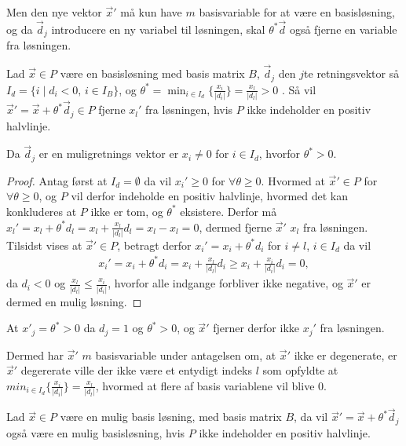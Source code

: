Men den nye vektor $\vec{x}'$ må kun have $m$ basisvariable for at være en basisløsning, og da $\vec{d}_j$ introducere en ny variabel til løsningen, skal $\theta^*\vec{d}$ også fjerne en variable fra  løsningen.
\begin{lma}
Lad $\vec{x} \in P$ være en basisløsning med basis matrix $B$, $\vec{d}_j$ den $j$te retningsvektor så $I_d = \{i \mid d_i < 0, \, i  \in I_B\}$, og $\theta^* = \min_{i \in I_d}\{\frac{x_i}{|d_i|}\}=\frac{x_l}{|d_l|} > 0$ . 
Så vil $\vec{x}' = \vec{x}+ \theta^* \vec{d}_j \in P$ fjerne $x_l'$ fra løsningen, hvis $P$ ikke indeholder en positiv halvlinje.
\label{lma:skalar}
\end{lma}
\begin{bem}
Da $\vec{d}_j$ er en muligretnings vektor er $x_i\neq 0$ for $i \in I_d$, hvorfor $\theta^* > 0$.
\end{bem}
\begin{proof}
Antag først at $I_d = \emptyset$ da vil $x_i' \geq 0$ for $\forall \theta \geq 0$. 
Hvormed at $\vec{x}' \in P$ for $\forall \theta \geq 0$, og $P$ vil derfor indeholde en positiv halvlinje, hvormed det kan konkluderes at $P$ ikke er tom, og $\theta^*$ eksistere.
Derfor må $x_l' = x_l + \theta^* d_l = x_l + \frac{x_l}{|d_l|}d_l = x_l - x_l = 0$, dermed fjerne $\vec{x}'$ $x_l$ fra løsningen.
Tilsidst vises at $\vec{x}' \in P$, betragt derfor $x_i' = x_i + \theta^* d_i$ for $i \neq l$, $i \in I_d$ da vil
\begin{align*}
x_i' = x_i + \theta^* d_i = x_i + \frac{x_l}{|d_l|}d_i \geq x_i + \frac{x_i}{|d_i|}d_i = 0,
\end{align*}
da $d_i < 0$ og $\frac{x_l}{|d_l|} \leq \frac{x_i}{|d_i|}$, hvorfor alle indgange forbliver ikke negative, og $\vec{x}'$ er dermed en mulig løsning.
\end{proof}
\begin{bem}
At $x'_j = \theta^* >  0$ da $d_j = 1$ og $\theta^* > 0$, og $\vec{x}'$ fjerner derfor ikke $x_j'$ fra løsningen.
\end{bem}
Dermed har $\vec{x}'$ $m$ basisvariable under antagelsen om, at $\vec{x}'$ ikke er degenerate, er $\vec{x}'$ degererate ville der ikke være et entydigt indeks $l$ som opfyldte at $min_{i \in I_d}\{\frac{x_i}{|d_i|}\}=\frac{x_l}{|d_l|}$, hvormed at flere af basis variablene  vil blive 0. 
\begin{stn}
Lad $\vec{x}\in P$ være en mulig basis løsning, med basis matrix $B$, da vil $\vec{x}' = \vec{x}+ \theta^*\vec{d}_j$ også være en mulig basisløsning, hvis $P$ ikke indeholder en positiv halvlinje.
\end{stn}
